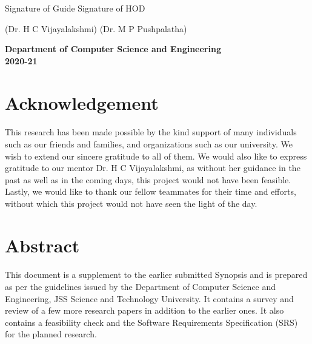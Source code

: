 \documentclass[14pt, a4paper]{extarticle}
\begin{document}
\begin{titlepage}
        \vspace{1.5in}
		\hspace{0.25in} Signature of Guide \hspace{1.8in} Signature of HOD

		(Dr. H C Vijayalakshmi) \hspace{1.4in} (Dr. M P Pushpalatha)
		
		\vspace{0.25in}
		\begin{center}       
            \textbf{Department of Computer Science and Engineering\\2020-21}		
		\end{center}
	\end{titlepage}
    
    \newpage
    \thispagestyle{empty}
    \section*{Acknowledgement}
        \paragraph{} This research has been made possible by the kind support of many individuals such as our friends and families, and organizations such as our university. We wish to extend our sincere gratitude to all of them. We would also like to express gratitude to our mentor Dr. H C Vijayalakshmi, as without her guidance in the past as well as in the coming days, this project would not have been feasible. Lastly, we would like to thank our fellow teammates for their time and efforts, without which this project would not have seen the light of the day.

	\newpage
    \thispagestyle{empty}
    \section*{Abstract}
        \paragraph{} This document is a supplement to the earlier submitted Synopsis and is prepared as per the guidelines issued by the Department of Computer Science and Engineering, JSS Science and Technology University. It contains a survey and review of a few more research papers in addition to the earlier ones. It also contains a feasibility check and the Software Requirements Specification (SRS) for the planned research.
\end{document}
